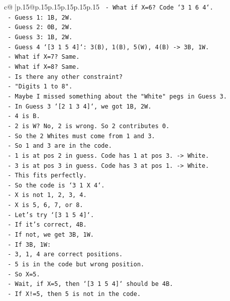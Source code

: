 \documentclass{article}
\begin{document}
{\begin{supertabular}{c@{$\;$}|p{.15\linewidth}@{}p{.15\linewidth}p{.15\linewidth}p{.15\linewidth}p{.15\linewidth}p{.15\linewidth}}
{{{\texttt{  {-} What if X=6? Code `3 1 6 4`.} \\
\texttt{    {-} Guess 1: 1B, 2W.} \\
\texttt{    {-} Guess 2: 0B, 2W.} \\
\texttt{    {-} Guess 3: 1B, 2W.} \\
\texttt{    {-} Guess 4 `{[}3 1 5 4{]}`: 3(B), 1(B), 5(W), 4(B) {-}> 3B, 1W.} \\
\texttt{  {-} What if X=7? Same.} \\
\texttt{  {-} What if X=8? Same.} \\
\texttt{  {-} Is there any other constraint?} \\
\texttt{  {-} "Digits 1 to 8".} \\
\texttt{  {-} Maybe I missed something about the "White" pegs in Guess 3.} \\
\texttt{  {-} In Guess 3 `{[}2 1 3 4{]}`, we got 1B, 2W.} \\
\texttt{  {-} 4 is B.} \\
\texttt{  {-} 2 is W? No, 2 is wrong. So 2 contributes 0.} \\
\texttt{  {-} So the 2 Whites must come from 1 and 3.} \\
\texttt{  {-} So 1 and 3 are in the code.} \\
\texttt{  {-} 1 is at pos 2 in guess. Code has 1 at pos 3. {-}> White.} \\
\texttt{  {-} 3 is at pos 3 in guess. Code has 3 at pos 1. {-}> White.} \\
\texttt{  {-} This fits perfectly.} \\
\texttt{  {-} So the code is `3 1 X 4`.} \\
\texttt{  {-} X is not 1, 2, 3, 4.} \\
\texttt{  {-} X is 5, 6, 7, or 8.} \\
\texttt{  {-} Let's try `{[}3 1 5 4{]}`.} \\
\texttt{  {-} If it's correct, 4B.} \\
\texttt{  {-} If not, we get 3B, 1W.} \\
\texttt{  {-} If 3B, 1W:} \\
\texttt{    {-} 3, 1, 4 are correct positions.} \\
\texttt{    {-} 5 is in the code but wrong position.} \\
\texttt{    {-} So X=5.} \\
\texttt{    {-} Wait, if X=5, then `{[}3 1 5 4{]}` should be 4B.} \\
\texttt{    {-} If X!=5, then 5 is not in the code.} \\
}}}
\end{supertabular}}
\end{document}
